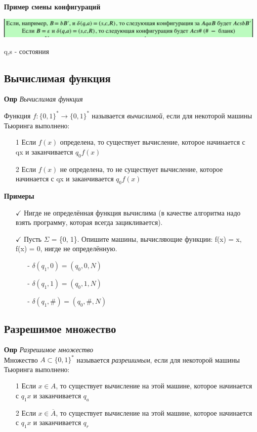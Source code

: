 \textbf{Пример смены конфигураций}\\
\begin{center}
    \includegraphics[width =17cm]{images/3 (определения)_mmm1.PNG}
\end{center}
q,s - состояния

\subsection{Вычислимая функция}

\textbf{Опр} \textit{Вычислимая функция}

Функция $f: \{0,1\}^* \rightarrow \{0,1\}^*$ называется \textit{вычислимой}, если для некоторой машины Тьюринга выполнено:
\begin{itemize}
    \item [1] Если $f(x)$ определена, то существует вычисление, которое начинается с qx и заканчивается $q_0f(x)$
    \item[2] Если $f(x)$ не определена, то не существует вычисление, которое начинается с qx и заканчивается $q_0f(x)$
\end{itemize}

\textbf{Примеры}

\begin{itemize}
    \item [$\checkmark$] Нигде не определённая функция вычислима (в качестве алгоритма надо взять программу, которая всегда зацикливается).
    \item [$\checkmark$] Пусть $\Sigma$ = \{0, 1\}. Опишите машины, вычисляющие функции: f(x) = x, f(x) = 0,
нигде не определённую.
    \begin{itemize}
        \item [-] $\delta(q_1,0) = (q_0, 0, N)$
        \item [-] $\delta(q_1,1) = (q_0, 1, N)$
        \item [-] $\delta(q_1,\#) = (q_0, \#, N)$
    \end{itemize}
\end{itemize}

\subsection{Разрешимое множество}

\textbf{Опр} \textit{Разрешимое множество}\\
Множество $A \subset \{0,1\}^*$ называется \textit{разрешимым}, если для некоторой машины Тьюринга выполнено:
\begin{itemize}
    \item [1] Если $x \in A$, то существует вычисление на этой машине, которое начинается с $q_1x$ и заканчивается $q_a$
     \item [2] Если $x \in \overline{A}$, то существует вычисление на этой машине, которое начинается с $q_1x$ и заканчивается $q_r$
\end{itemize}

